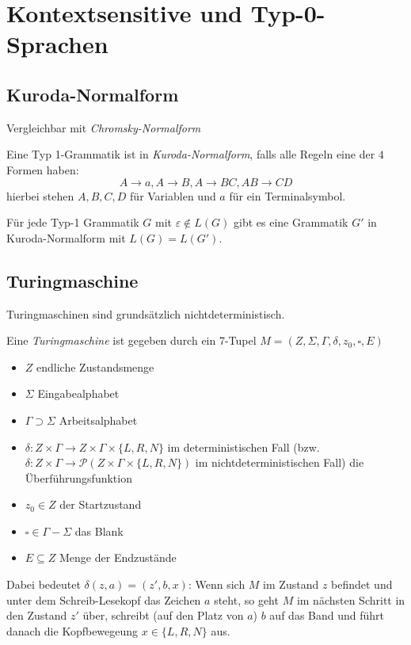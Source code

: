 \documentclass{scrartcl}
\begin{document}
\section*{Kontextsensitive und Typ-0-Sprachen}
\subsection*{Kuroda-Normalform}
{\tiny Vergleichbar mit \emph{Chromsky-Normalform}}
\begin{shaded}
    Eine Typ 1-Grammatik ist in \emph{Kuroda-Normalform}, falls alle Regeln eine der $4$ Formen haben: \[ A\to a, A\to B, A\to BC, AB\to CD \]
    hierbei stehen $A,B,C,D$ für Variablen und $a$ für ein Terminalsymbol.
\end{shaded}

\begin{shaded}
    Für jede Typ-1 Grammatik $G$ mit $\varepsilon \not\in L(G)$ gibt es eine Grammatik $G'$ in Kuroda-Normalform mit $L(G) = L(G')$.
\end{shaded}

\subsection*{Turingmaschine}
{\tiny Turingmaschinen sind grundsätzlich nichtdeterministisch.}
\begin{shaded}
    Eine \emph{Turingmaschine} ist gegeben durch ein 7-Tupel $M=(Z,\Sigma,\Gamma,\delta,z_0,\square,E)$
    \begin{minipage}[t]{0.48\textwidth}
    \begin{itemize}
        \item $Z$ endliche Zustandsmenge
        \item $\Sigma$ Eingabealphabet
        \item $\Gamma\supset\Sigma$ Arbeitsalphabet
        \item $\delta:Z\times\Gamma\to Z\times\Gamma\times\{L,R,N\}$ im deterministischen Fall (bzw. $\delta:Z\times\Gamma\to\mathcal{P}(Z\times\Gamma\times\{L,R,N\})$ im nichtdeterministischen Fall) die Überführungsfunktion
    \end{itemize}
    \end{minipage}
    \hfill \vrule \hfill
    \begin{minipage}[t]{0.48\textwidth}
    \begin{itemize}
        \item $z_0\in Z$ der Startzustand
        \item $\square\in\Gamma-\Sigma$ das Blank
        \item $E\subseteq Z$ Menge der Endzustände
    \end{itemize}
    \end{minipage}
\end{shaded}
Dabei bedeutet $\delta(z,a)=(z',b,x)$: Wenn sich $M$ im Zustand $z$ befindet und unter dem Schreib-Lesekopf das Zeichen $a$ steht, so geht $M$ im nächsten Schritt in den Zustand $z'$ über, schreibt (auf den Platz von $a$) $b$ auf das Band und führt danach die Kopfbewegeung $x\in\{L,R,N\}$ aus.
\end{document}
